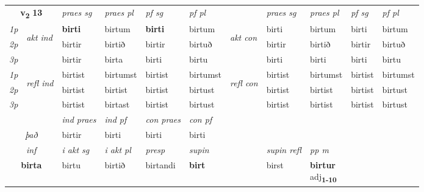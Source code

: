 \noindent
\begin{tabular}{lllllllllll} \toprule
\multicolumn{2}{c}{\textbf{v{\textsubscript{2}}} \Large{\textbf{13}}}  &  \textit{praes sg}  & \textit{praes pl}  &\textit{ pf sg} & \textit{pf pl} &  &  \textit{praes sg}  & \textit{praes pl}  & \textit{pf sg} & \textit{pf pl } \\*
	\cmidrule{3-6} \cmidrule{8-11}
 {\textit{1p}} & \multirow{3}{*}{\begin{turn}{90}\textit{akt ind}\end{turn}} & \textbf{birti} & birtum & \textbf{birti} & birtum & \multirow{3}{*}{\begin{turn}{90}\textit{akt con}\end{turn}} &birti & birtum & birti & birtum\\*
 {\textit{2p}} &  &  birtir  & birtið & birtir & birtuð & & birtir & birtið & birtir & birtuð \\*
{\textit{3p}} &  & birtir & birta & birti & birtu & & birti & birti& birti & birtu \\*
\cmidrule{3-6} \cmidrule{8-11}
 {\textit{1p}} & \multirow{3}{*}{\begin{turn}{90}\textit{refl ind}\end{turn}}  & birtist & birtumst & birtist & birtumst & \multirow{3}{*}{\begin{turn}{90}\textit{refl con}\end{turn}}  &birtist & birtumst & birtist & birtumst \\*
 {\textit{2p}} &  & birtist & birtist & birtist & birtust & &birtist & birtist & birtist & birtust \\*
 {\textit{3p}}  & & birtist & birtast & birtist & birtust & & birtist & birtist& birtist & birtust \\*
\cmidrule{3-6} \cmidrule{8-11}

   & &  \textit{ind praes} & \textit{ind pf} & \textit{con praes} & \textit{con pf} \\*
\multicolumn{2}{c}{ \textit{það} } & birtir & birti & birti & birti \\*

\cmidrule{3-9}
   \multicolumn{2}{c}{\textit{inf}}  & \textit{i akt sg} & \textit{i akt pl}   & \textit{presp} & \textit{supin} && \textit{supin refl} & \textit{pp m} \\*
  \multicolumn{2}{c}{\textbf{birta}} & birtu  & birtið   & birtandi &  \textbf{birt} && birst & \specialcell{\textbf{birtur} \\ adj\textbf{\textsubscript{1-10}}} \\*
\end{tabular}

